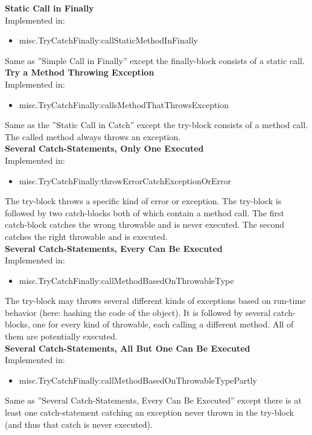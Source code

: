 \documentclass{article}
\begin{document}
\noindent
\textbf{Static Call in Finally}\\
Implemented in: 
\begin{itemize}
    \item misc.TryCatchFinally:callStaticMethodInFinally
\end{itemize}
Same as ''Simple Call in Finally'' except the finally-block consists of a static call.\\

\noindent
\textbf{Try a Method Throwing Exception}\\
Implemented in: 
\begin{itemize}
    \item misc.TryCatchFinally:callsMethodThatThrowsException
\end{itemize}
Same as the ''Static Call in Catch'' except the try-block consists of a method call. The called method always throws an exception.\\

\noindent
\textbf{Several Catch-Statements, Only One Executed}\\
Implemented in: 
\begin{itemize}
    \item misc.TryCatchFinally:throwErrorCatchExceptionOrError
\end{itemize}
The try-block throws a specific kind of error or exception. The try-block is followed by two catch-blocks both of which contain a method call. The first catch-block catches the wrong throwable and is never executed. The second catches the right throwable and is executed.\\

\noindent
\textbf{Several Catch-Statements, Every Can Be Executed}\\
Implemented in: 
\begin{itemize}
    \item misc.TryCatchFinally:callMethodBasedOnThrowableType
\end{itemize}
The try-block may throws several different kinds of exceptions based on run-time behavior (here: hashing the code of the object). It is followed by several catch-blocks, one for every kind of throwable, each calling a different method. All of them are potentially executed.\\

\noindent
\textbf{Several Catch-Statements, All But One Can Be Executed}\\
Implemented in: 
\begin{itemize}
    \item misc.TryCatchFinally:callMethodBasedOnThrowableTypePartly
\end{itemize}
Same as ''Several Catch-Statements, Every Can Be Executed'' except there is at least one catch-statement catching an exception never thrown in the try-block (and thus that catch is never executed).\\
\end{document}
